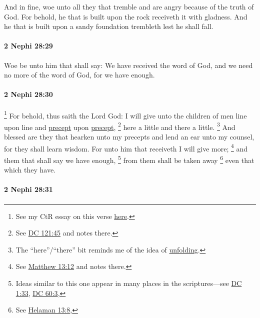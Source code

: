 			And in fine, woe unto all they
			that tremble and are angry because of the truth of God.
			For behold, he that is built upon the rock receiveth it with gladness.
			And he that is built upon a sandy foundation trembleth lest he shall fall.

		\paragraph{2 Nephi 28:29} %
			\label{2NEPHI-28-29}

			Woe be unto him that shall say:
			We have received the word of God,
			and we need no more of the word of God,
			for we have enough.

		\paragraph{2 Nephi 28:30} %
			\label{2NEPHI-28-30}

				\footnote{%
					See my CtR essay on this verse \href{https://climbingtherainbows.substack.com/p/the-constructive-nature-of-revelation-f3e}{here}.
					}
			For behold, thus saith the Lord God:
			I will give unto the children of men line upon line and \hyperref[PRECEPT]{precept} upon \hyperref[PRECEPT]{precept},%
				\footnote{%
					See \hyperref[DC121-45]{DC 121:45} and notes there.
					} 
			here a little and there a little.%
				\footnote{%
					The ``here''/``there'' bit reminds me of the idea of \hyperref[UNFOLD]{unfolding}. 
					}
			And blessed are they that hearken unto my precepts
			and lend an ear unto my counsel,
			for they shall learn wisdom.
			For unto him that receiveth I will give more;%
				\footnote{%
					See \hyperref[MATTHEW-13-12]{Matthew 13:12} and notes there.
					}
			and them that shall say we have enough,
				\footnote{%
					Ideas similar to this one appear in many places in the scriptures---see \hyperref[DC1-33]{DC 1:33}, \hyperref[DC60-3]{DC 60:3},
					}%
			from them shall be taken away%
				\footnote{%
					See \hyperref[HELAMAN-13-8]{Helaman 13:8}, 
					}
			even that which they have.

		\paragraph{2 Nephi 28:31} %
			\label{2NEPHI-28-31}

